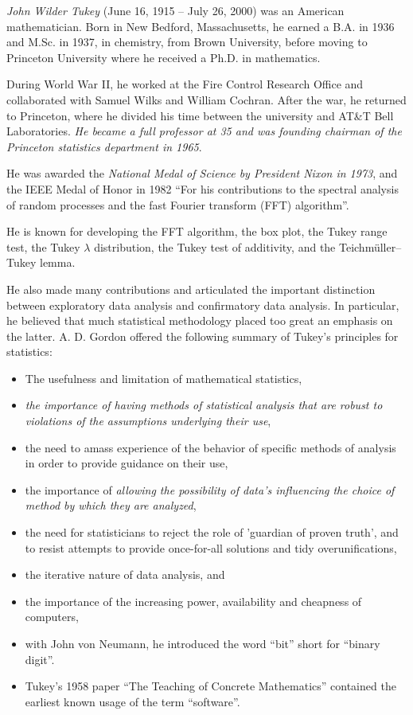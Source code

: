 	\emph{John Wilder Tukey} (June 16, 1915 – July 26, 2000) was an American mathematician.	Born in New Bedford, Massachusetts, he earned a B.A. in 1936 and M.Sc. in 1937, in chemistry, from Brown University, before moving to Princeton University where he received a Ph.D. in mathematics. 
	
	During World War II, he worked at the Fire Control Research Office and collaborated with Samuel Wilks and William Cochran. After the war, he returned to Princeton, where he divided his time between the university and AT\&T Bell Laboratories. \emph{He became a full professor at 35 and was founding chairman of the Princeton statistics department in 1965}. 
	
	He was awarded the \emph{National Medal of Science by President Nixon in 1973}, and the IEEE Medal of Honor in 1982 \enquote{For his contributions to the spectral analysis of random processes and the fast Fourier transform (FFT) algorithm}.

	He is known for developing the FFT algorithm, the box plot, the Tukey range test, the Tukey $\lambda$ distribution, the Tukey test of additivity, and the Teichmüller–Tukey lemma. 
	
	He also made many contributions and articulated the important distinction between exploratory data analysis and confirmatory data analysis. In particular, he believed that much statistical methodology placed too great an emphasis on the latter. A. D. Gordon offered the following summary of Tukey's principles for statistics: 
	\begin{itemize}
		\setlength{\itemsep}{0pt}
		\setlength{\parskip}{0pt} 		
		\item The usefulness and limitation of mathematical statistics, 
		\item \emph{the importance of having methods of statistical analysis that are robust to violations of the assumptions underlying their use},  
		\item the need to amass experience of the behavior of specific methods of analysis in order to provide guidance on their use,  
		\item the importance of \emph{allowing the possibility of data's influencing the choice of method by which they are analyzed}, 
		\item the need for statisticians to reject the role of 'guardian of proven truth', and to resist attempts to provide once-for-all solutions and tidy overunifications, 
		\item the iterative nature of data analysis, and 
		\item the importance of the increasing power, availability and cheapness of computers,
		\item with John von Neumann, he introduced the word \enquote{bit} short for \enquote{binary digit}. 
		\item Tukey's 1958 paper \enquote{The Teaching of Concrete Mathematics} contained the earliest known usage of the term \enquote{software}.
	\end{itemize}
